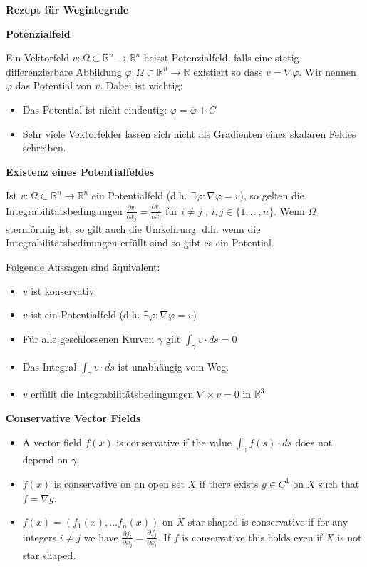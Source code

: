 \documentclass[25pt]{sciposter}
\newcommand{\R}{\mathbb{R}}
\newenvironment{method}[1]{\begin{mdframed}[backgroundcolor=blue!10,innertopmargin=15pt, innerbottommargin=15pt, nobreak=true]
		\textbf{#1 }
	}
	{ 
	\end{mdframed}
}
\begin{document}
\begin{multicols}{3}
\begin{method}{Rezept für Wegintegrale}
\end{method}


\begin{method}{Potenzialfeld}
	Ein Vektorfeld $v:\Omega\subset \R^n \to \R^n$ heisst Potenzialfeld, falls eine stetig differenzierbare Abbildung $\varphi:\Omega \subset \R^n \to \R$ existiert so dass $v = \nabla \varphi$. Wir nennen $\varphi$ das Potential von $v$. Dabei ist wichtig:
	\begin{itemize}
		\item Das Potential ist nicht eindeutig: $\varphi = \overline{\varphi} + C$
		\item Sehr viele Vektorfelder lassen sich nicht als Gradienten eines skalaren Feldes schreiben.
	\end{itemize}
\end{method}

\begin{method}{Existenz eines Potentialfeldes}
	Ist $v : \Omega \subset \R^n \to \R^n$ ein Potentialfeld (d.h. $\exists \varphi : \nabla \varphi = v$), so gelten die Integrabilitätsbedingungen $\frac{\partial v_i}{\partial x_j} = \frac{\partial v_j}{\partial x_i}$ für $i\neq j$ , $i,j\in\{1,\ldots,n\}$. Wenn $\Omega$ sternförmig ist, so gilt auch die Umkehrung. d.h. wenn die Integrabilitätsbedinungen erfüllt sind so gibt es ein Potential.
	
	Folgende Aussagen sind äquivalent:
	
	\begin{itemize}
		\item $v$ ist konservativ
		\item $v$ ist ein Potentialfeld  (d.h. $\exists \varphi : \nabla \varphi = v$)
		\item Für alle geschlossenen Kurven $\gamma$ gilt $\int_\gamma v\cdot ds = 0$
		\item Das Integral $\int_\gamma v\cdot ds$ ist unabhängig vom Weg.
		\item $v$ erfüllt die Integrabilitätsbedingungen $\nabla \times v = 0$ in $\R^3$
	\end{itemize}
	
\end{method}


\ifx
\begin{method}{Conservative Vector Fields}
	 \begin{itemize}
	 	\item 	A vector field $f(x)$ is conservative if the value $\int_{\gamma} f(s)\cdot ds$ does not depend on $\gamma$. 
	 	\item $f(x)$ is conservative on an open set $X$ if there exists $g\in C^1$ on $X$ such that $f = \nabla g$.
	 	\item  $f(x) = (f_1(x),\ldots f_n(x))$ on $X$ star shaped is conservative if for any integers $i\neq j$ we have $\frac{\partial f_i}{\partial x_j} = \frac{\partial f_j}{\partial x_i}$. If $f$ is conservative this holds even if $X$ is not star shaped.
	 \end{itemize}	
\end{method}
\fi





\end{multicols}
\end{document}

